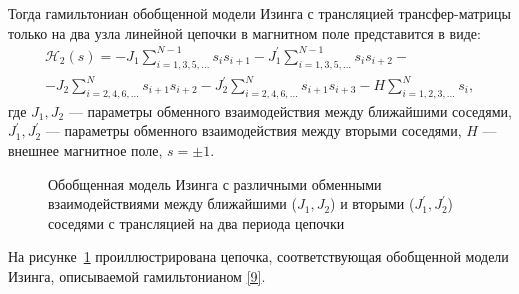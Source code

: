 Тогда гамильтониан обобщенной модели Изинга с трансляцией трансфер-матрицы только на два узла линейной цепочки в магнитном поле представится в виде:
\begin{multline}
\mathcal{H}_2(s)=-J_1\sum_{i=1,3,5,\dots}^{N-1} s_i s_{i+1} - J_1^{'}\sum_{i=1,3,5,\dots}^{N-1} s_i s_{i+2} -\\-J_2\sum_{i=2,4,6,\dots}^{N} s_{i+1} s_{i+2} -J_2^{'}\sum_{i=2,4,6,\dots}^{N} s_{i+1} s_{i+3} - H\sum_{i=1,2,3,\dots}^{N}s_i
\label{9},
\end{multline}
где $J_1, J_2$ --- параметры обменного взаимодействия между ближайшими соседями, $J^{'}_1, J^{'}_2$ --- параметры обменного взаимодействия между вторыми соседями, $H$ --- внешнее магнитное поле, $s=\pm 1$.

 \begin{figure}[h]
 	\caption{Обобщенная модель Изинга с различными обменными взаимодействиями между ближайшими ($J_1, J_2$) и вторыми ($J_1^{'}, J_2^{'}$) соседями с трансляцией на два периода цепочки}
 	\label{genChain}
 \end{figure}

На рисунке~\ref{genChain} проиллюстрирована цепочка, соответствующая обобщенной модели Изинга, описываемой гамильтонианом \eqref{9}.

